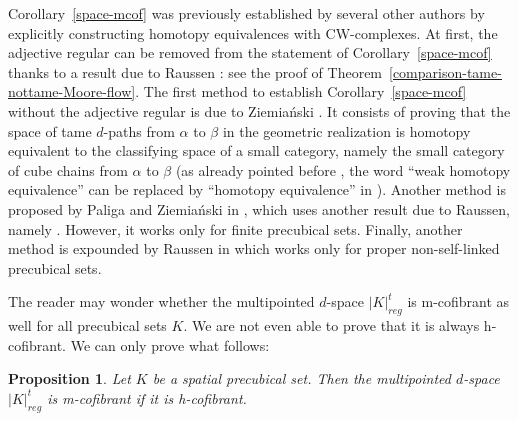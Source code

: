 \documentclass[a4paper,12pt]{amsart}
\newtheorem{prop}[thm]{Proposition}
\newcommand{\bp}{\begin{prop}}
\newcommand{\ep}{\end{prop}}
\theoremstyle{definition}
\begin{document}
Corollary~\ref{space-mcof} was previously established by several other authors by explicitly constructing homotopy equivalences with CW-complexes. At first, the adjective regular can be removed from the statement of Corollary~\ref{space-mcof} thanks to a result due to Raussen \cite[Proposition~2.16]{MR2521708}: see the proof of Theorem~\ref{comparison-tame-nottame-Moore-flow}. The first method to establish Corollary~\ref{space-mcof} without the adjective regular is due to Ziemia\'{n}ski \cite[Theorem~6.1, Theorem~7.5 and Theorem~7.6]{MR4070250}. It consists of proving that the space of tame $d$-paths from $\alpha$ to $\beta$ in the geometric realization is homotopy equivalent to the classifying space of a small category, namely the small category of cube chains from $\alpha$ to $\beta$ (as already pointed before \cite[Corollary~7.9]{NaturalRealization}, the word ``weak homotopy equivalence'' can be replaced by ``homotopy equivalence'' in \cite[Theorem~7.5 and Theorem~7.6]{MR4070250}). Another method is proposed by Paliga and Ziemia\'{n}ski in \cite[Proposition~6.5]{PZ}, which uses another result due to Raussen, namely \cite[Proposition~3.15]{MR2521708}. However, it works only for finite precubical sets. Finally, another method is expounded by Raussen in \cite{raussen2021strictifying} which works only for proper non-self-linked precubical sets.

The reader may wonder whether the multipointed $d$-space $|K|^t_{reg}$ is m-cofibrant as well for all precubical sets $K$. We are not even able to prove that it is always h-cofibrant. We can only prove what follows:

\bp \label{m-spatial}
Let $K$ be a spatial precubical set. Then the multipointed $d$-space $|K|^t_{reg}$ is m-cofibrant if it is h-cofibrant.
\ep
\end{document}
